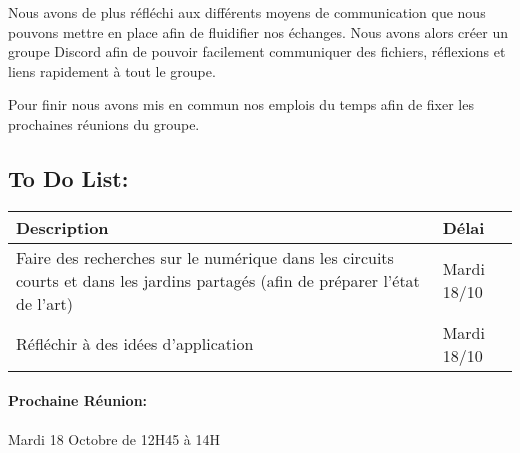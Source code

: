 \documentclass[french, 12pt]{article}
\begin{document}
Nous avons de plus réfléchi aux différents moyens de communication que nous pouvons mettre en place afin de fluidifier nos échanges. Nous avons alors créer un groupe Discord afin de pouvoir facilement communiquer des fichiers, réflexions et liens rapidement à tout le groupe.

Pour finir nous avons mis en commun nos emplois du temps afin de fixer les prochaines réunions du groupe.


\subsection*{To Do List:}
\noindent
\begin{tabular}{|L{12cm}|L{4cm}|}
\hline Description & Délai \\
\hline Faire des recherches sur le numérique dans les circuits courts et dans les jardins partagés (afin de préparer l'état de l'art) & Mardi 18/10 \\
\hline Réfléchir à des idées d'application & Mardi 18/10\\
\hline 

\end{tabular}

\paragraph{Prochaine Réunion:}
Mardi 18 Octobre de 12H45 à 14H



 


 
 
\end{document}
